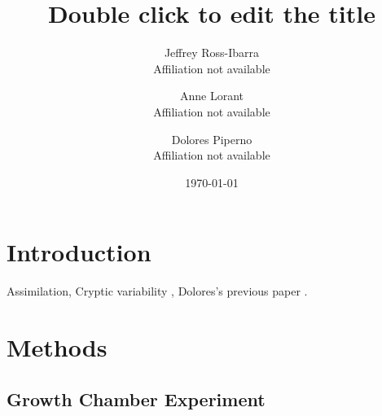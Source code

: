\documentclass{article}
\begin{document}
\title{Double click to edit the title}

\author{Jeffrey Ross-Ibarra\\ Affiliation not available  \and Anne Lorant\\ Affiliation not available \and Dolores Piperno\\ Affiliation not available}

\date{\today}



\maketitle 




\section{Introduction}
Assimilation, Cryptic variability \cite{Lauter2002}, Dolores's previous paper \cite{Piperno_Holst_Winter_McMillan_2014}. 





\section{Methods}
\subsection{Growth Chamber Experiment} %
\end{document}
